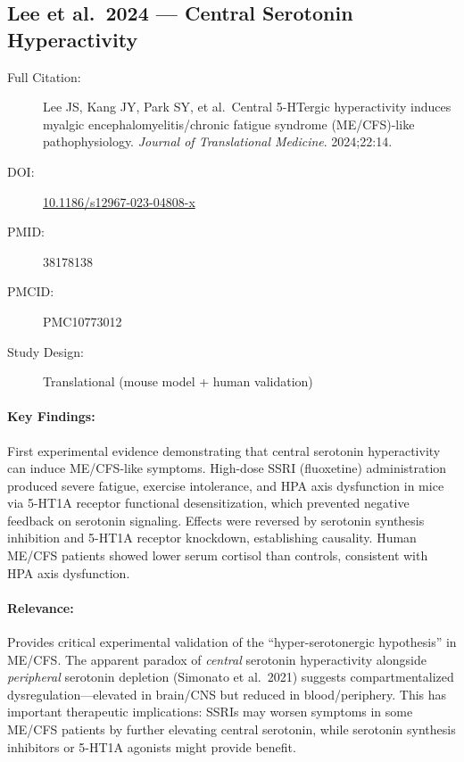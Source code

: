 \subsection{Lee et al.\ 2024 --- Central Serotonin Hyperactivity}

\begin{description}
    \item[Full Citation:] Lee JS, Kang JY, Park SY, et al.\ Central 5-HTergic hyperactivity induces myalgic encephalomyelitis/chronic fatigue syndrome (ME/CFS)-like pathophysiology. \textit{Journal of Translational Medicine}. 2024;22:14.
    \item[DOI:] \href{https://doi.org/10.1186/s12967-023-04808-x}{10.1186/s12967-023-04808-x}
    \item[PMID:] 38178138
    \item[PMCID:] PMC10773012
    \item[Study Design:] Translational (mouse model + human validation)
\end{description}

\paragraph{Key Findings:}
First experimental evidence demonstrating that central serotonin hyperactivity can induce ME/CFS-like symptoms. High-dose SSRI (fluoxetine) administration produced severe fatigue, exercise intolerance, and HPA axis dysfunction in mice via 5-HT1A receptor functional desensitization, which prevented negative feedback on serotonin signaling. Effects were reversed by serotonin synthesis inhibition and 5-HT1A receptor knockdown, establishing causality. Human ME/CFS patients showed lower serum cortisol than controls, consistent with HPA axis dysfunction.

\paragraph{Relevance:}
Provides critical experimental validation of the ``hyper-serotonergic hypothesis'' in ME/CFS. The apparent paradox of \textit{central} serotonin hyperactivity alongside \textit{peripheral} serotonin depletion (Simonato et al.\ 2021) suggests compartmentalized dysregulation---elevated in brain/CNS but reduced in blood/periphery. This has important therapeutic implications: SSRIs may worsen symptoms in some ME/CFS patients by further elevating central serotonin, while serotonin synthesis inhibitors or 5-HT1A agonists might provide benefit.

